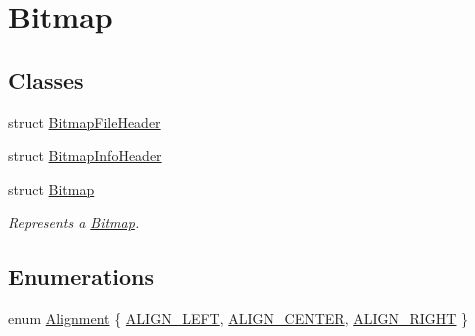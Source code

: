 \hypertarget{group___bitmap}{}\section{Bitmap}
\label{group___bitmap}
\subsection*{Classes}
\begin{DoxyCompactItemize}
\item 
struct \hyperlink{struct_bitmap_file_header}{Bitmap\+File\+Header}
\item 
struct \hyperlink{struct_bitmap_info_header}{Bitmap\+Info\+Header}
\item 
struct \hyperlink{struct_bitmap}{Bitmap}
\begin{DoxyCompactList}\small\item\em Represents a \hyperlink{struct_bitmap}{Bitmap}. \end{DoxyCompactList}\end{DoxyCompactItemize}
\subsection*{Enumerations}
\begin{DoxyCompactItemize}
\item 
enum \hyperlink{group___bitmap_gacdfaca60ec19c0265bac2692d7982726}{Alignment} \{ \hyperlink{group___bitmap_ggacdfaca60ec19c0265bac2692d7982726a6ec599857e15466988726932dd592305}{A\+L\+I\+G\+N\+\_\+\+L\+E\+FT}, 
\hyperlink{group___bitmap_ggacdfaca60ec19c0265bac2692d7982726a5624165187e56db612253e608a45b1c6}{A\+L\+I\+G\+N\+\_\+\+C\+E\+N\+T\+ER}, 
\hyperlink{group___bitmap_ggacdfaca60ec19c0265bac2692d7982726a9c81840e8cad46418b39a8b74a246354}{A\+L\+I\+G\+N\+\_\+\+R\+I\+G\+HT}
 \}
\end{DoxyCompactItemize}
